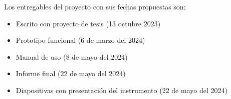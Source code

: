 %
Los entregables del proyecto  con sus fechas propuestas son:

\begin{itemize}
	\item Escrito con proyecto de tesis (13 octubre 2023)
	\item Prototipo funcional (6 de marzo del 2024)
	\item Manual de uso (8 de mayo del 2024)
	\item Informe final (22 de mayo del 2024)
	\item Diapositivas con presentación del instrumento (22 de mayo del 2024)
\end{itemize}
%
